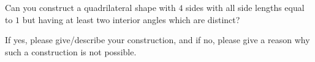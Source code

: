 Can you construct a quadrilateral shape with $4$ sides with all side lengths equal to $1$ but having at least two interior angles which are distinct?

If yes, please give/describe your construction, and if no, please give a reason why such a construction is not possible.
